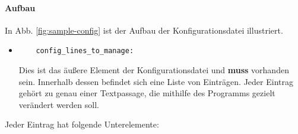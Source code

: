 \paragraph{Aufbau}
In Abb. \ref{fig:sample-config} ist der Aufbau der Konfigurationsdatei
illustriert.

\begin{itemize}
  \item \begin{verbatim}
    config_lines_to_manage:
  \end{verbatim}
        Dies ist das äußere Element der Konfigurationsdatei und \textbf{muss}
        vorhanden sein. Innerhalb dessen befindet sich eine Liste von Einträgen.
        Jeder Eintrag gehört zu genau einer \gls{Textpassage}, die mithilfe des
        Programms gezielt verändert werden soll.
\end{itemize}



Jeder Eintrag hat folgende Unterelemente:


